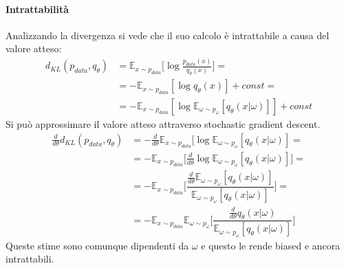			\paragraph{Intrattabilit\`a}
			Analizzando la divergenza si vede che il suo calcolo \`e intrattabile a causa del valore atteso:
			\begin{align*}
				d_{KL}(p_{data}, q_\theta) &= \mathbb{E}_{x\sim p_{data}}\bigl[\log\frac{p_{data}(x)}{q_\theta(x)}\bigr]=\\
																	 & = -\mathbb{E}_{x\sim p_{data}}[\log q_\theta(x)] + const=\\
																	 &= -\mathbb{E}_{x\sim p_{data}}[\log\mathbb{E}_{\omega\sim p_\omega} [q_\theta(x|\omega)]]+const
			\end{align*}
			Si pu\`o approssimare il valore atteso attraverso stochastic gradient descent.
			\begin{align*}
				\frac{d}{d\theta}d_{KL}(p_{data},q_\theta) &= -\frac{d}{d\theta}\mathbb{E}_{x\sim p_{data}}[\log\mathbb{E}_{\omega\sim p_\omega}[q_\theta(x|\omega)]=\\
																									 & = -\mathbb{E}_{x\sim p_{data}}\bigl[\frac{d}{d\theta}\log\mathbb{E}_{\omega\sim p_\omega}[q_\theta(x|\omega)]\bigr]=\\
																									 & = - \mathbb{E}_{x\sim p_{data}}\biggl[\dfrac{\frac{d}{d\theta}\mathbb{E}_{\omega\sim p_\omega}[q_\theta(x|\omega)]}{\mathbb{E}_{\omega\sim p_\omega}[q_\theta(x|\omega)]}\biggr]=\\
																									 & = - \mathbb{E}_{x\sim p_{data}}\mathbb{E}_{\omega\sim p_\omega}\biggl[\dfrac{\frac{d}{d\theta}q_\theta(x|\omega)}{\mathbb{E}_{\omega\sim p_\omega}[q_\theta(x|\omega)]}\biggr]
			\end{align*}
			Queste stime sono comunque dipendenti da $\omega$ e questo le rende biased e ancora intrattabili.

